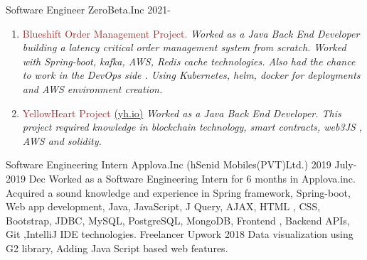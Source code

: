 \documentclass[11pt]{spidercv}
\begin{document}
    





    \begin{MainPart}

    \Experience
        {\ColorHighlight}
		{Software Engineer}
		{ZeroBeta.Inc}
        {2021-\faUndo}
        {           
         \begin{enumerate}
             \item \textcolor{brown}{Blueshift Order Management Project.} \newline
             \textit{Worked as a Java Back End Developer building a latency critical order management system from scratch. Worked with Spring-boot, kafka, AWS, Redis cache  technologies. Also had the chance to work in the DevOps side . Using Kubernetes, helm, docker for deployments and AWS environment creation.
}
             \item  \textcolor{brown}{YellowHeart Project }\href{https://yh.io/}{(yh.io)}   \newline
             \textit{Worked as a Java Back End Developer. This project required knowledge in blockchain technology, smart contracts, web3JS , AWS and solidity. }
         \end{enumerate}
           
        }
    \Experience
        {\ColorHighlight}
		{Software Engineering Intern}
		{Applova.Inc (hSenid Mobiles(PVT)Ltd.)}
        {2019 July- 2019 Dec}
        {   
            Worked as a Software Engineering Intern for 6 months in Applova.inc. \newline
            Acquired a sound knowledge and experience in Spring framework, Spring-boot, Web app development, Java, JavaScript, J Query, AJAX, HTML , CSS, Bootstrap, JDBC, MySQL, PostgreSQL, MongoDB, Frontend , Backend APIs, Git ,IntelliJ IDE technologies.
        }
    \Experience
        {\ColorHighlight}
		{Freelancer}
		{Upwork}
        {2018}
        {   
          Data visualization using G2 library, Adding Java Script based web features.
        }



\end{MainPart}
\end{document}
